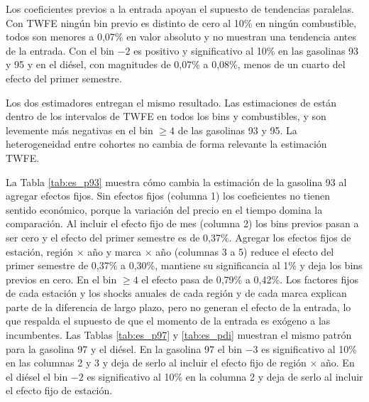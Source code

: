 Los coeficientes previos a la entrada apoyan el supuesto de tendencias paralelas. Con TWFE ningún bin previo es distinto de cero al 10\% en ningún combustible, todos son menores a 0,07\% en valor absoluto y no muestran una tendencia antes de la entrada. Con \textcite{SUNABRAHAM2021} el bin $-2$ es positivo y significativo al 10\% en las gasolinas 93 y 95 y en el diésel, con magnitudes de 0,07\% a 0,08\%, menos de un cuarto del efecto del primer semestre.

Los dos estimadores entregan el mismo resultado. Las estimaciones de \textcite{SUNABRAHAM2021} están dentro de los intervalos de TWFE en todos los bins y combustibles, y son levemente más negativas en el bin $\geq 4$ de las gasolinas 93 y 95. La heterogeneidad entre cohortes no cambia de forma relevante la estimación TWFE.

La Tabla \ref{tab:es_p93} muestra cómo cambia la estimación de la gasolina 93 al agregar efectos fijos. Sin efectos fijos (columna 1) los coeficientes no tienen sentido económico, porque la variación del precio en el tiempo domina la comparación. Al incluir el efecto fijo de mes (columna 2) los bins previos pasan a ser cero y el efecto del primer semestre es de 0,37\%. Agregar los efectos fijos de estación, región $\times$ año y marca $\times$ año (columnas 3 a 5) reduce el efecto del primer semestre de 0,37\% a 0,30\%, mantiene su significancia al 1\% y deja los bins previos en cero. En el bin $\geq 4$ el efecto pasa de 0,79\% a 0,42\%. Los factores fijos de cada estación y los shocks anuales de cada región y de cada marca explican parte de la diferencia de largo plazo, pero no generan el efecto de la entrada, lo que respalda el supuesto de que el momento de la entrada es exógeno a las incumbentes. Las Tablas \ref{tab:es_p97} y \ref{tab:es_pdi} muestran el mismo patrón para la gasolina 97 y el diésel. En la gasolina 97 el bin $-3$ es significativo al 10\% en las columnas 2 y 3 y deja de serlo al incluir el efecto fijo de región $\times$ año. En el diésel el bin $-2$ es significativo al 10\% en la columna 2 y deja de serlo al incluir el efecto fijo de estación.

\begin{table}[htbp]
    \centering
    \caption{Estudio de eventos por especificación de efectos fijos, gasolina 93} \label{tab:es_p93}
    
    \caption*{\footnotesize Fuente: Precios históricos de bencinaenlinea.cl. Panel mensual 2012 a 2026, log del precio $\times$ 100. Errores estándar agrupados por comuna entre paréntesis. * p$<$0,10 ** p$<$0,05 *** p$<$0,01. Bins de seis meses desde la entrada, referencia en $-1$. Tratadas son estación con una entrada competidora a 2 km o menos, controles son estaciones sin entradas a menos de 5 km. Sin efecto fijo de estación (columnas 1 y 2) se controla por el indicador de tratada. Tratadas y controles son estaciones que usa cada modelo.}
\end{table}

